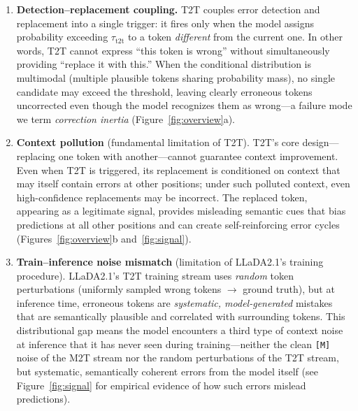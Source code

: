 \documentclass{article}
\newcommand{\mask}{\texttt{[M]}}
\newcommand{\MtoT}{\textrm{M2T}}
\newcommand{\TtoT}{\textrm{T2T}}
\begin{document}
\begin{enumerate}
    \item \textbf{Detection--replacement coupling.} \TtoT{} couples error detection and replacement into a single trigger: it fires only when the model assigns probability exceeding $\tau_{\text{t2t}}$ to a token \emph{different} from the current one. In other words, \TtoT{} cannot express ``this token is wrong'' without simultaneously providing ``replace it with this.'' When the conditional distribution is multimodal (multiple plausible tokens sharing probability mass), no single candidate may exceed the threshold, leaving clearly erroneous tokens uncorrected even though the model recognizes them as wrong---a failure mode we term \emph{correction inertia} (Figure~\ref{fig:overview}a).

    \item \textbf{Context pollution} (fundamental limitation of \TtoT{}). \TtoT{}'s core design---replacing one token with another---cannot guarantee context improvement. Even when \TtoT{} is triggered, its replacement is conditioned on context that may itself contain errors at other positions; under such polluted context, even high-confidence replacements may be incorrect. The replaced token, appearing as a legitimate signal, provides misleading semantic cues that bias predictions at all other positions and can create self-reinforcing error cycles (Figures~\ref{fig:overview}b and~\ref{fig:signal}).

    \item \textbf{Train--inference noise mismatch} (limitation of LLaDA2.1's training procedure). LLaDA2.1's \TtoT{} training stream uses \emph{random} token perturbations (uniformly sampled wrong tokens $\to$ ground truth), but at inference time, erroneous tokens are \emph{systematic, model-generated} mistakes that are semantically plausible and correlated with surrounding tokens. This distributional gap means the model encounters a third type of context noise at inference that it has never seen during training---neither the clean \mask{} noise of the \MtoT{} stream nor the random perturbations of the \TtoT{} stream, but systematic, semantically coherent errors from the model itself (see Figure~\ref{fig:signal} for empirical evidence of how such errors mislead predictions).
\end{enumerate}
\end{document}
